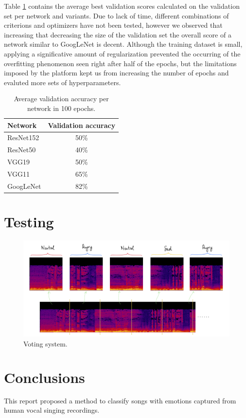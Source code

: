 \documentclass[10pt,twocolumn,letterpaper]{article}
\begin{document}
Table \ref{tab:accuracy} contains the average best validation scores calculated on the validation set per network and variants. Due to lack of time, different combinations of criterions and optimizers have not been tested, however we observed that increasing that decreasing the size of the validation set the overall score of a network similar to GoogLeNet is decent. Although the training dataset is small, applying a significative amount of regularization prevented the occurring of the overfitting phenomenon seen right after half of the epochs, but the limitations imposed by the platform kept us from increasing the number of epochs and evaluted more sets of hyperparameters.

\begin{table}
   \begin{center}
   \def\arraystretch{1.5}
   \begin{tabular}{l|c}
   Network & Validation accuracy \\
   \hline
   ResNet152 & 50\%  \\
   \hline
   ResNet50 & 40\%  \\
   \hline
   VGG19 & 50\% \\
   \hline
   VGG11 & 65\% \\
   \hline
   GoogLeNet & 82\% \\
   \end{tabular}
   \end{center}
   \caption{Average validation accuracy per network in 100 epochs.}
   \label{tab:accuracy}
   \end{table}

\section{Testing}\label{testing}

\begin{figure}
   \begin{center}
   \includegraphics[width=0.8\linewidth]{img/voting-system}
   \end{center}
      \caption{Voting system.}
   \label{fig:voting}
   \end{figure}

\section{Conclusions}\label{conclusions}

This report proposed a method to classify songs with emotions captured from human vocal singing recordings.


{\small


}
\end{document}
